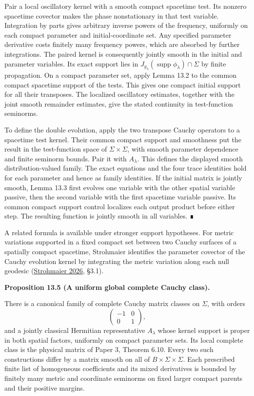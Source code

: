 \documentclass[
  english,
  11pt,
  reqno]{amsart}
\makeatletter
\newcommand{\pandocstatementheading}[1]{%
  \par\addpenalty{\@beginparpenalty}%
  \addvspace{.5\baselineskip plus .2\baselineskip minus .2\baselineskip}%
  {\normalfont\bfseries #1\par}%
  \nobreak\@afterindenttrue\@afterheading
}
\newcommand{\paperblockheading}[2][.45\baselineskip]{%
  \par\Needspace{6\baselineskip}%
  \addvspace{\baselineskip}%
  \noindent{\normalfont\bfseries #2}\par\nobreak
  \vskip#1\relax\nobreak
}
\makeatother
\begin{document}
Pair a local oscillatory kernel with a smooth compact spacetime test.
Its nonzero spacetime covector makes the phase nonstationary in that
test variable. Integration by parts gives arbitrary inverse powers of
the frequency, uniformly on each compact parameter and
initial-coordinate set. Any specified parameter derivative costs
finitely many frequency powers, which are absorbed by further
integrations. The paired kernel is consequently jointly smooth in the
initial and parameter variables. Its exact support lies in
\(J_{g_\lambda}(\operatorname{supp}\phi_\lambda)\cap\Sigma\) by finite
propagation. On a compact parameter set, apply Lemma 13.2 to the common
compact spacetime support of the tests. This gives one compact initial
support for all their transposes. The localized oscillatory estimates,
together with the joint smooth remainder estimates, give the stated
continuity in test-function seminorms.

To define the double evolution, apply the two transpose Cauchy operators
to a spacetime test kernel. Their common compact support and smoothness
put the result in the test-function space of \(\Sigma\times\Sigma\),
with smooth parameter dependence and finite seminorm bounds. Pair it
with \(A_\lambda\). This defines the displayed smooth
distribution-valued family. The exact equations and the four trace
identities hold for each parameter and hence as family identities. If
the initial matrix is jointly smooth, Lemma 13.3 first evolves one
variable with the other spatial variable passive, then the second
variable with the first spacetime variable passive. Its common compact
support control localizes each output product before either step. The
resulting function is jointly smooth in all variables. ∎

A related formula is available under stronger support hypotheses. For
metric variations supported in a fixed compact set between two Cauchy
surfaces of a spatially compact spacetime, Strohmaier identifies the
parameter covector of the Cauchy evolution kernel by integrating the
metric variation along each null geodesic
(\hyperref[ref-Strohmaier2026]{Strohmaier 2026}, §3.1).

\paperblockheading[0pt]{The joint Cauchy and wave classes.}

\pandocstatementheading{\protect{}\label{prop:family-global-cauchy-class}Proposition 13.5 (A uniform global complete Cauchy class).}

There is a canonical family of complete Cauchy matrix classes on
\(\Sigma\), with orders \[
\begin{pmatrix}-1&0\\0&1\end{pmatrix},
\] and a jointly classical Hermitian representative \(A_\lambda\) whose
kernel support is proper in both spatial factors, uniformly on compact
parameter sets. Its local complete class is the physical matrix of Paper
3, Theorem 6.10. Every two such constructions differ by a matrix smooth
on all of \(B\times\Sigma\times\Sigma\). Each prescribed finite list of
homogeneous coefficients and its mixed derivatives is bounded by
finitely many metric and coordinate seminorms on fixed larger compact
parents and their positive margins.
\end{document}
